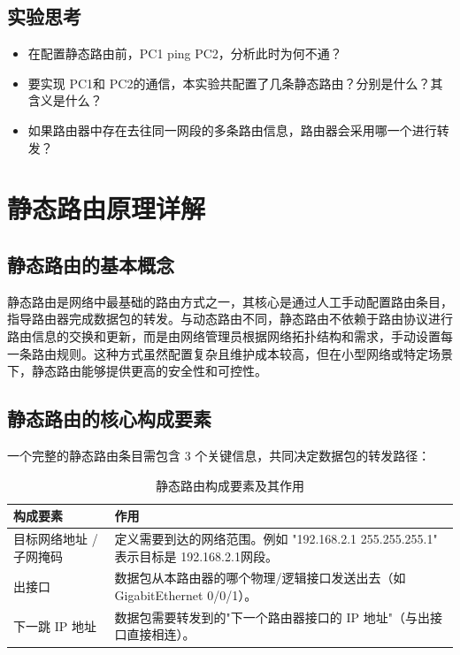 \documentclass[a4paper]{article}
\begin{document}
\subsection{实验思考}
\begin{itemize}
    \item 在配置静态路由前，PC1 ping PC2，分析此时为何不通？
    \item 要实现 PC1和 PC2的通信，本实验共配置了几条静态路由？分别是什么？其含义是什么？
    \item 如果路由器中存在去往同一网段的多条路由信息，路由器会采用哪一个进行转发？
\end{itemize}

\section{静态路由原理详解}
\subsection{静态路由的基本概念}
静态路由是网络中最基础的路由方式之一，其核心是通过人工手动配置路由条目，指导路由器完成数据包的转发\cite{ref1}。与动态路由不同，静态路由不依赖于路由协议进行路由信息的交换和更新，而是由网络管理员根据网络拓扑结构和需求，手动设置每一条路由规则。这种方式虽然配置复杂且维护成本较高，但在小型网络或特定场景下，静态路由能够提供更高的安全性和可控性。

\subsection{静态路由的核心构成要素}
一个完整的静态路由条目需包含 3 个关键信息，共同决定数据包的转发路径：
\begin{table}[htbp]
\centering

\label{tab:static_route}
\begin{tabular}{|>{\raggedright\arraybackslash}p{}|>{\raggedright\arraybackslash}p{}|}
\hline
\textbf{构成要素} & \textbf{作用} \\
\hline
目标网络地址 / 子网掩码 & 定义需要到达的网络范围。例如 "192.168.2.1 255.255.255.1" 表示目标是 192.168.2.1网段。\\
\hline
出接口 & 数据包从本路由器的哪个物理/逻辑接口发送出去（如 GigabitEthernet 0/0/1）。\\
\hline
下一跳 IP 地址 & 数据包需要转发到的"下一个路由器接口的 IP 地址"（与出接口直接相连）。\\
\hline
\end{tabular}
\caption{静态路由构成要素及其作用}
\end{table}
\end{document}
